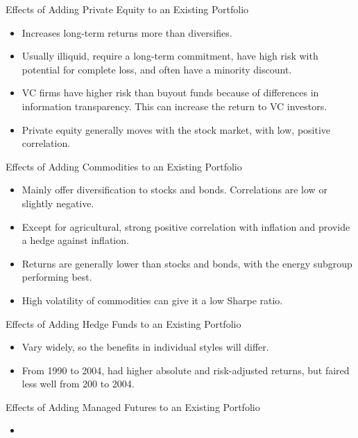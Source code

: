 \documentclass[../custom,grid]{flashcards}
\begin{document}
\begin{flashcard}{Effects of Adding Private Equity to an Existing Portfolio}
    \begin{itemize}
        \item Increases long-term returns more than diversifies.
        \item Usually illiquid, require a long-term commitment, have high risk with potential for complete loss, and often have a minority discount.
        \item VC firms have higher risk than buyout funds because of differences in information transparency. This can increase the return to VC investors.
        \item Private equity generally moves with the stock market, with low, positive correlation.
    \end{itemize}
\end{flashcard}

\begin{flashcard}{Effects of Adding Commodities to an Existing Portfolio}
    \begin{itemize}
        \item Mainly offer diversification to stocks and bonds. Correlations are low or slightly negative.
        \item Except for agricultural, strong positive correlation with inflation and provide a hedge against inflation.
        \item Returns are generally lower than stocks and bonds, with the energy subgroup performing best.
        \item High volatility of commodities can give it a low Sharpe ratio.
    \end{itemize}
\end{flashcard}

\begin{flashcard}{Effects of Adding Hedge Funds to an Existing Portfolio}
    \begin{itemize}
        \item Vary widely, so the benefits in individual styles will differ.
        \item From 1990 to 2004, had higher absolute and risk-adjusted returns, but faired less well from 200 to 2004.
    \end{itemize}
\end{flashcard}

\begin{flashcard}{Effects of Adding Managed Futures to an Existing Portfolio}
    \begin{itemize}
        \item 
    \end{itemize}
\end{flashcard}
\end{document}
